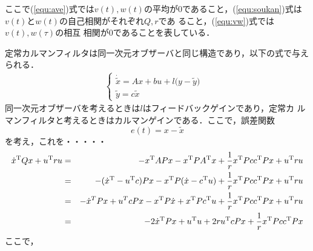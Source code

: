 \documentclass[a4paper,12pt]{jarticle}
\begin{document}
%
ここで(\ref{equ:ave})式では$v(t),w(t)$の平均が0であること，(\ref{equ:soukan})式は
$v(t)$と$w(t)$の自己相関がそれぞれ$Q,r$であ
ること，(\ref{equ:vw})式では$v(t),w(\tau)$の相互
相関が0であることを表している．

定常カルマンフィルタは同一次元オブザーバと同じ構造であり，以下の式で与え
られる．
%
\begin{eqnarray}
 \begin{cases}
\dot{\tilde{x}} = Ax + bu + l \big(y - \tilde{y} \big)
  & \\
  \tilde{y} = c\tilde{x}
 \end{cases}
\end{eqnarray}
%
同一次元オブザーバを考えるときは$l$はフィードバックゲインであり，定常カ
ルマンフィルタと考えるときはカルマンゲインである．ここで，誤差関数
\begin{equation}
 e(t) = x - \tilde{x}
\end{equation}
を考え，これを・・・・・
\begin{eqnarray}
 \dot{x}^{\rm{T}} Q x + u^{\rm{T}} ru & = & -x^{\rm{T}}APx-x^{\rm{T}}PA^{\rm{T}}x+\frac{1}{r}x^{\rm{T}}Pcc^{\rm{T}}Px+u^{\rm{T}}ru \\
 & = & -(\dot{x}^{\rm{T}} -
  u^{\rm{T}}c)Px-x^{\rm{T}}P(\dot{x}-c^{\rm{T}}u)+\frac{1}{r}x^{\rm{T}}Pcc^{\rm{T}}Px+u^{\rm{T}}ru \\
 & = & -\dot{x}^T Px + u^T cPx -x^{\rm{T}}P\dot{x} + x^{\rm{T}}
  Pc^{\rm{T}}u + \frac{1}{r}x^{\rm{T}}Pcc^{\rm{T}}Px+u^{\rm{T}}ru \\
 & = & -2 \dot{x}^{\rm{T}}Px + u^{\rm{T}}u + 2ru^{\rm{T}}cPx + \frac{1}{r}x^{\rm{T}}Pcc^{\rm{T}}Px
\end{eqnarray}
ここで，
\end{document}
